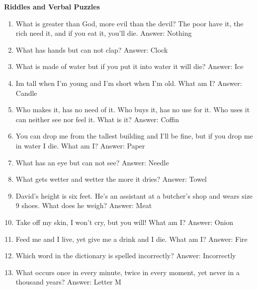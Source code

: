 \documentclass[11pt]{article}
\begin{document}
 

\textbf{Riddles and Verbal Puzzles}
\begin{enumerate}[label = \arabic*. ]

\item What is greater than God,
more evil than the devil? The poor have it, the rich need it,
and if you eat it, you'll die. \hfill Answer: Nothing 

\item What has hands but can not clap? \hfill Answer: Clock  

\item What is made of water but if you put it into water it will die? \hfill Answer: Ice

\item Im tall when I'm young and I'm short when I'm old. What am I? \hfill Answer: Candle

\item Who makes it, has no need of it. Who buys it, has no use for it. Who uses it can neither see nor feel it. What is it? \hfill Answer: Coffin 

\item You can drop me from the tallest building and I'll be fine, but if you drop me in water I die. What am I? \hfill Answer: Paper

\item What has an eye but can not see? \hfill Answer: Needle

\item What gets wetter and wetter the more it dries? \hfill Answer: Towel 

\item David's height is six feet. He's an assistant at a butcher's shop and wears size 9 shoes. What does he weigh? \hfill Answer: Meat

\item Take off my skin, I won't cry, but you will! What am I? \hfill Answer: Onion 

\item Feed me and I live, yet give me a drink and I die. What am I? \hfill Answer: Fire

\item Which word in the dictionary is spelled incorrectly? \hfill Answer: Incorrectly 

\item What occurs once in every minute, twice in every moment, yet never in a thousand years? \hfill Answer: Letter M


\end{enumerate}
\end{document}
